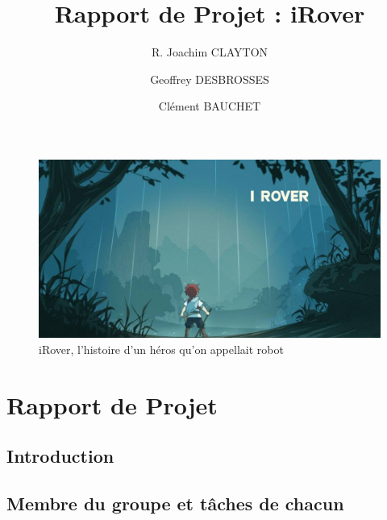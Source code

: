 \documentclass[a4paper 12pts]{article}
\title{Rapport de Projet : iRover}
\author{R. Joachim CLAYTON}
\author{Geoffrey DESBROSSES}
\author{Clément BAUCHET}
\begin{document}
\maketitle


\begin{figure}[h]
   \includegraphics[width=350pt]{Illustration/proj_irover.jpg}
	\caption{iRover, l'histoire d'un héros qu'on appellait robot}
\end{figure}



\newpage


\renewcommand{\contentsname}{Sommaire} 
\tableofcontents

\newpage








\section{Rapport de Projet}


\vspace{2cm}



\subsection{Introduction}
\subsection{Membre du groupe et tâches de chacun}



\vspace{1 cm}
\end{document}
